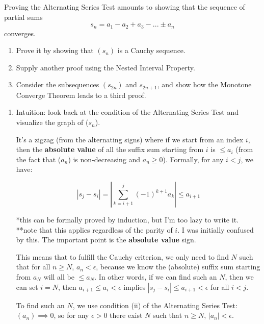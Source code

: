 \documentclass{oxmathproblems}
\begin{document}
\begin{questions}

\miquestion Proving the Alternating Series Test amounts to showing that the sequence of partial sums
\[s_n = a_1 - a_2 + a_3 - ... \pm a_n\]
converges.

\begin{enumerate}[label=(\alph*)]
  \item Prove it by showing that $(s_n)$ is a Cauchy sequence.
  \item Supply another proof using the Nested Interval Property.
  \item Consider the subsequences $(s_{2n})$ and $s_{2n+1}$, and show how the Monotone Converge Theorem leads to a third proof.
\end{enumerate}

\begin{solution}
  \begin{enumerate}[label=(\alph*)]
    \item Intuition: look back at the condition of the Alternating Series Test and visualize the graph of ($s_n$).
    
    It's a zigzag (from the alternating signs) where if we start from an index $i$, then the \textbf{absolute value} of all
    the suffix sum starting from $i$ is $\leq a_{i}$ (from the fact that ($a_n$) is non-decreasing and $a_n \geq 0$).
    Formally, for any $i < j$, we have:

    \[|s_j - s_{i}| = |\sum_{k=i+1}^{j}(-1)^{k+1}a_{k}| \leq a_{i+1}\]

    *this can be formally proved by induction, but I'm too lazy to write it. \\
    **note that this applies regardless of the parity of $i$. I was initially confused by this. The important point is the \textbf{absolute value} sign.

    This means that to fulfill the Cauchy criterion, we only need to find $N$ such that for all $n \geq N$, $a_n < \epsilon$, because we know
    the (absolute) suffix sum starting from $a_N$ will all be $\leq a_N$. In other words, if we can find such an $N$, then we can set
    $i=N$, then $a_{i+1} \leq a_{i} < \epsilon$ implies $|s_j - s_{i}| \leq a_{i+1} < \epsilon$ for all $i < j$.

    To find such an $N$, we use condition (ii) of the Alternating Series Test: $(a_n) \implies 0$, so for any $\epsilon > 0$ there exist $N$ such that $n \geq N$, $|a_n| < \epsilon$.
  

\end{enumerate}
\end{solution}
\end{questions}
\end{document}
